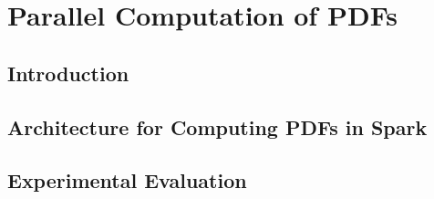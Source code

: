 \chapter{Parallel Computation of PDFs}\label{cap_ji}

\section{Introduction}

\section{Architecture for Computing PDFs in Spark}

\section{Experimental Evaluation}
